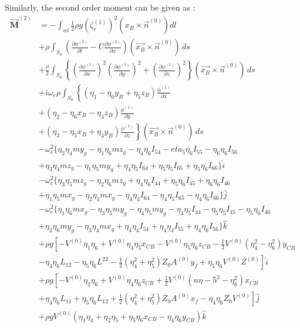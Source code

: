 Similarly, the second order moment can be given as :
\begin{align}
    \boldsymbol{\vec{M}}^{(2)} &= -\int_{wl}\frac{1}{2}\rho g (\zeta_r^{(1)})^2 (x_B\times \vec{n}^{(0)}) dl \\ \nonumber
    &+\rho\int_{S_0}\left(\frac{\partial \phi^{(2)}}{\partial t} - U\frac{\partial \phi^{(2)}}{\partial x}\right)
    (\vec{x_B}\times\vec{n}^{(0)})\,ds \\ \nonumber
    &+\frac{\rho}{2}\int_{S_0}\left\{\left(\frac{\partial \phi^{(1)}}{\partial x}\right)^2
    \left(\frac{\partial \phi^{(1)}}{\partial y}\right)^2 + \left(\frac{\partial \phi^{(1)}}{\partial z}\right)^2
    \right\}(\vec{x_B}\times\vec{n}^{(0)})\,ds \\ \nonumber
    &+i\omega_e\rho\int_{S_0}
    \left\{(\eta_1-\eta_6y_B+\eta_5z_B)\frac{\phi^{(1)}}{\partial x} \right. \\ \nonumber 
    &\left. + (\eta_2-\eta_6x_B-\eta_4z_B)\frac{\phi^{(1)}}{\partial y}\right. \\ \nonumber
    &\left. + (\eta_3-\eta_5x_B+\eta_4y_B)\frac{\phi^{(1)}}{\partial z}\right\}
    (\vec{x_B}\times \vec{n}^{(0)})\,ds \\ \nonumber
    &-\omega_e^2\{\eta_2\eta_4my_g-\eta_1\eta_6mz_g-\eta_4\eta_6I_{54}
    -eta_5\eta_6I_{55}-\eta_6\eta_6I_{56} \\ \nonumber
    &+\eta_3\eta_4mz_g-\eta_1\eta_5my_g+\eta_4\eta_5I_{64}+\eta_5\eta_5 I_{65}
    +\eta_5\eta_6 I_{66} \}\hat{i} \\ \nonumber
    &-\omega_e^2\{\eta_3\eta_5mz_g-\eta_2\eta_6mz_g+\eta_4\eta_6I_{44}+\eta_5\eta_6 I_{45}
    +\eta_6\eta_6I_{46}\\ \nonumber
    &+\eta_1\eta_5mx_g-\eta_2\eta_4mx_g-\eta_4\eta_4 I_{64}-\eta_4\eta_5 I_{65}-\eta_4\eta_6 I_{66}\} \hat{j} \\ \nonumber
    &-\omega_e^2\{\eta_1\eta_6mx_g-\eta_3\eta_5my_g-\eta_4\eta_5my_g-\eta_4\eta_5 I_{44}
    -\eta_5\eta_5 I_{45}-\eta_5\eta_6 I_{46} \\ \nonumber
    &+\eta_2\eta_6my_g-\eta_3\eta_4mx_g+\eta_4\eta_4 I_{54}+\eta_4\eta_4 I_{55}
    +\eta_4\eta_6 I_{56} \}\hat{k} \\ \nonumber
    &+\rho g \left[-V^{(0)}\eta_1\eta_6+V^{(0)}\eta_4\eta_5x_{CB}-V^{(0)}\eta_5\eta_6z_{CB}
    -\frac{1}{2}V^{(0)}(\eta_4^2-\eta_6^2)y_{CB} \right. \\ \nonumber
    &\left.-\eta_4\eta_6L_{12} -\eta_5\eta_6L^{22}-\frac{1}{2}(\eta_4^2+\eta_5^2)
    Z_0A^{(0)}y_f+\eta_5\eta_6V^{(0)}Z^{(0)}\right]\hat{i} \\ \nonumber
    &+\rho g \left[-V^{(0)}\eta_2\eta_6+V^{(0)}\eta_4\eta_6 z_{CB}+\frac{1}{2}V^{(0)} 
    (n\eta-5^2-\eta_6^2)x_{CB} \right. \\ \nonumber
    &\left. +\eta_4\eta_6 L_{11}+\eta_5\eta_6L_{12}+\frac{1}{2}(\eta_4^2+\eta_5^2)Z_0A^{(0)}x_f
    -\eta_4\eta_6 Z_0V^{(0)}\right]\hat{j} \\ \nonumber
    &+\rho g V^{(0)}(\eta_1\eta_4+\eta_2\eta_5+\eta_5\eta_6x_{CB}-\eta_4\eta_6y_{CB})\hat{k}
\end{align}
